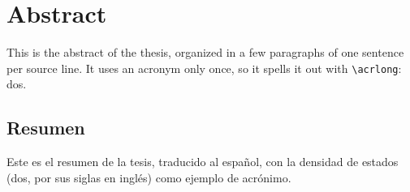 \documentclass[../main]{subfiles}
\begin{document}
\chapter*{Abstract}
This is the abstract of the thesis, organized in a few paragraphs of one sentence per source line.
It uses an acronym only once, so it spells it out with \verb|\acrlong|: \acrlong{dos}.
\lipsum[1]

\lipsum[2-3]

\begin{otherlanguage}{spanish}
\chapter*{Resumen}
Este es el resumen de la tesis, traducido al español, con la densidad de estados (\acrshort{dos}, por sus siglas en inglés) como ejemplo de acrónimo.
\lipsum[1]

\lipsum[2-3]
\end{otherlanguage}
\end{document}
